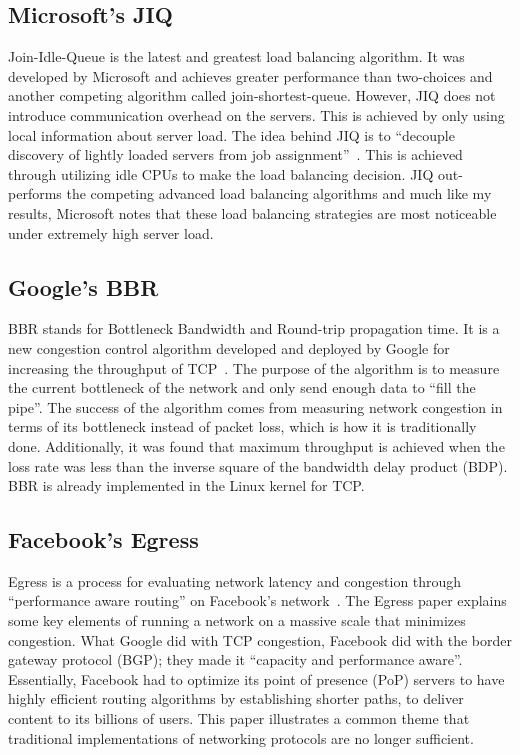 \subsection{Microsoft's JIQ}
Join-Idle-Queue is the latest and greatest load balancing algorithm.
It was developed by Microsoft and achieves greater performance than
two-choices and another competing algorithm called
join-shortest-queue. However, JIQ does not introduce communication
overhead on the servers. This is achieved by only using local
information about server load. The idea behind JIQ is to ``decouple
discovery of lightly loaded servers from job assignment''~\cite{jiq}.
This is achieved through utilizing idle CPUs to make the load
balancing decision. JIQ out-performs the competing advanced load
balancing algorithms and much like my results, Microsoft notes that
these load balancing strategies are most noticeable under extremely
high server load.

\subsection{Google's BBR}
BBR stands for Bottleneck Bandwidth and Round-trip propagation time.
It is a new congestion control algorithm developed and deployed by
Google for increasing the throughput of TCP~\cite{bbr}. The purpose of
the algorithm is to measure the current bottleneck of the network and
only send enough data to ``fill the pipe''. The success of the
algorithm comes from measuring network congestion in terms of its
bottleneck instead of packet loss, which is how it is traditionally
done. Additionally, it was found that maximum throughput is achieved when
the loss rate was less than the inverse square of the bandwidth delay
product (BDP). BBR is already implemented in the Linux kernel for
TCP.\

\subsection{Facebook's Egress}
Egress is a process for evaluating network latency and congestion
through ``performance aware routing'' on Facebook’s
network~\cite{egress}. The Egress paper explains some key elements of
running a network on a massive scale that minimizes congestion. What
Google did with TCP congestion, Facebook did with the border gateway
protocol (BGP); they made it ``capacity and performance aware''.
Essentially, Facebook had to optimize its point of presence (PoP)
servers to have highly efficient routing algorithms by establishing
shorter paths, to deliver content to its billions of users. This paper
illustrates a common theme that traditional implementations of
networking protocols are no longer sufficient.


